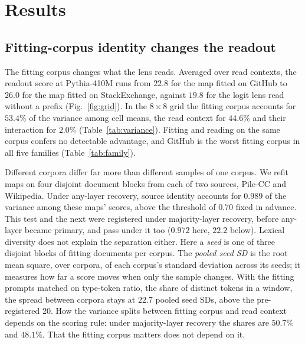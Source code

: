 \documentclass{article}
\begin{document}
\section{Results}
\label{sec:results}

\subsection{Fitting-corpus identity changes the readout}
\label{sec:corpus}

The fitting corpus changes what the lens reads. Averaged over read contexts, the readout score at
Pythia-410M runs from $22.8$ for the map fitted on GitHub to $26.0$ for the map fitted on
StackExchange, against $19.8$ for the logit lens read without a prefix (Fig.~\ref{fig:grid}). In the $8\times8$ grid the
fitting corpus accounts for $53.4\%$ of the variance among cell means, the read context for $44.6\%$
and their interaction for $2.0\%$ (Table~\ref{tab:variance}). Fitting and reading on the same corpus
confers no detectable advantage, and GitHub is the worst fitting corpus in all five families
(Table~\ref{tab:family}).

Different corpora differ far more than different samples of one corpus. We refit maps on four
disjoint document blocks from each of two sources, Pile-CC and Wikipedia. Under any-layer recovery,
source identity accounts for $0.989$ of the variance among these maps' scores, above the threshold of
$0.70$ fixed in advance. This test and the next were registered under majority-layer recovery, before
any-layer became primary, and pass under it too ($0.972$ here, $22.2$ below). Lexical diversity does
not explain the separation either. Here a \emph{seed} is one of three disjoint blocks of fitting
documents per corpus. The \emph{pooled seed SD} is the root mean square, over corpora, of each
corpus's standard deviation across its seeds; it measures how far a score moves when only the sample
changes. With the fitting prompts matched on type-token ratio, the share of distinct tokens in
a window, the spread between corpora stays at $22.7$ pooled seed SDs, above the pre-registered 20. How the variance splits between fitting corpus and read
context depends on the scoring rule: under majority-layer recovery the shares are $50.7\%$ and
$48.1\%$. That the fitting corpus matters does not depend on it.
\end{document}
